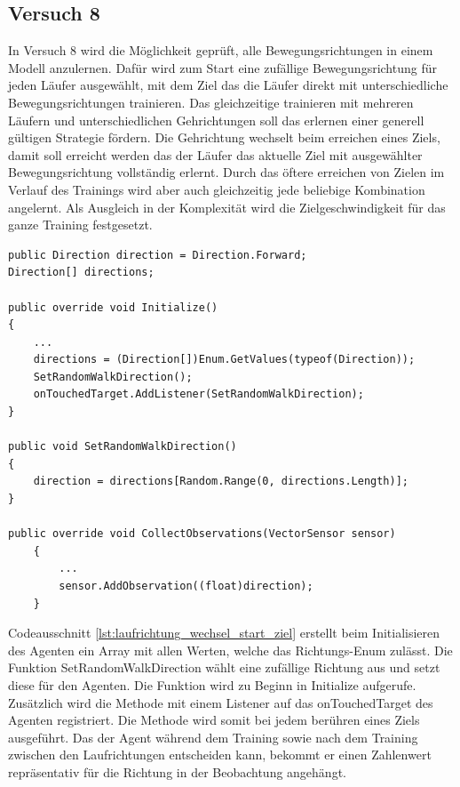 \subsection{Versuch 8}
In Versuch 8 wird die Möglichkeit geprüft, alle Bewegungsrichtungen in einem Modell anzulernen. Dafür wird zum Start eine zufällige Bewegungsrichtung für jeden Läufer ausgewählt, mit dem Ziel das die Läufer direkt mit unterschiedliche Bewegungsrichtungen trainieren. Das gleichzeitige trainieren mit mehreren Läufern und unterschiedlichen Gehrichtungen soll das erlernen einer generell gültigen Strategie fördern. Die Gehrichtung wechselt beim erreichen eines Ziels, damit soll erreicht werden das der Läufer das aktuelle Ziel mit ausgewählter Bewegungsrichtung vollständig erlernt. Durch das öftere erreichen von Zielen im Verlauf des Trainings wird aber auch gleichzeitig jede beliebige Kombination angelernt. Als Ausgleich in der Komplexität wird die Zielgeschwindigkeit für das ganze Training festgesetzt.

\begin{lstlisting}[caption={Laufrichtung zufällig zum Start und beim erreichen von Ziel},captionpos=b,label={lst:laufrichtung_wechsel_start_ziel}]
public Direction direction = Direction.Forward;
Direction[] directions;

public override void Initialize()
{
    ...
    directions = (Direction[])Enum.GetValues(typeof(Direction));
    SetRandomWalkDirection();
    onTouchedTarget.AddListener(SetRandomWalkDirection);
}

public void SetRandomWalkDirection()
{
    direction = directions[Random.Range(0, directions.Length)];
}

public override void CollectObservations(VectorSensor sensor)
    {
        ...
        sensor.AddObservation((float)direction);
    }
\end{lstlisting}

Codeausschnitt \ref{lst:laufrichtung_wechsel_start_ziel} erstellt beim Initialisieren des Agenten ein Array mit allen Werten, welche das Richtungs-Enum zulässt. Die Funktion SetRandomWalkDirection wählt eine zufällige Richtung aus und setzt diese für den Agenten. Die Funktion wird zu Beginn in Initialize aufgerufe. Zusätzlich wird die Methode mit einem Listener auf das onTouchedTarget des Agenten registriert. Die Methode wird somit bei jedem berühren eines Ziels ausgeführt. Das der Agent während dem Training sowie nach dem Training zwischen den Laufrichtungen entscheiden kann, bekommt er einen Zahlenwert repräsentativ für die Richtung in der Beobachtung angehängt.

